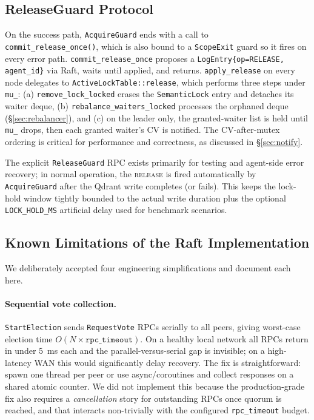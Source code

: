 \documentclass[sigconf]{acmart}
\begin{document}
\subsection{ReleaseGuard Protocol}
\label{sec:release}

On the success path, \texttt{AcquireGuard} ends with a call to \\
\texttt{commit\_release\_once()}, which is also bound to a \texttt{ScopeExit}
guard so it fires on every error path. \texttt{commit\_release\_once}
proposes a \texttt{LogEntry\{op=RELEASE, agent\_id\}} via Raft, waits until
applied, and returns. \texttt{apply\_release} on every node delegates to
\texttt{ActiveLockTable::release}, which performs three steps under
\texttt{mu\_}: (a) \texttt{remove\_lock\_locked} erases the
\texttt{SemanticLock} entry and detaches its waiter deque,
(b) \texttt{rebalance\_waiters\_locked} processes the orphaned deque
(\S\ref{sec:rebalancer}), and (c) on the leader only, the granted-waiter
list is held until \texttt{mu\_} drops, then each granted waiter's CV is
notified. The CV-after-mutex ordering is critical for performance and
correctness, as discussed in \S\ref{sec:notify}.

The explicit \texttt{ReleaseGuard} RPC exists primarily for testing and
agent-side error recovery; in normal operation, the \textsc{release} is
fired automatically by \texttt{AcquireGuard} after the Qdrant write
completes (or fails). This keeps the lock-hold window tightly bounded
to the actual write duration plus the optional \texttt{LOCK\_HOLD\_MS}
artificial delay used for benchmark scenarios.

\subsection{Known Limitations of the Raft Implementation}
\label{sec:raft-limit}

We deliberately accepted four engineering simplifications and document
each here.

\paragraph{\textbf{Sequential vote collection.}} \texttt{StartElection} sends
\texttt{RequestVote} RPCs serially to all peers, giving worst-case
election time $O(N\times \texttt{rpc\_timeout})$. On a healthy local
network all RPCs return in under 5~ms each and the parallel-versus-serial
gap is invisible; on a high-latency WAN this would significantly delay
recovery. The fix is straightforward: spawn one thread per peer or use async/coroutines and collect responses on a shared atomic
counter. We did not implement this because the production-grade fix
also requires a \emph{cancellation} story for outstanding RPCs once
quorum is reached, and that interacts non-trivially with the
configured \texttt{rpc\_timeout} budget.
\end{document}
